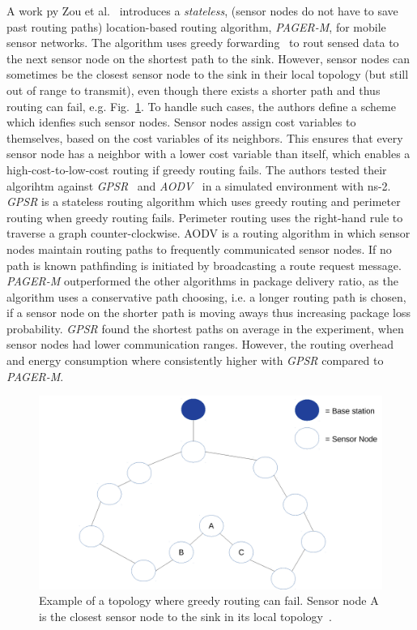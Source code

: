 A work py Zou et al.~\cite{zou2004pager} introduces a \textit{stateless},
(sensor nodes do not have to save past routing paths) location-based routing
algorithm, \textit{PAGER-M}, for mobile sensor networks. The algorithm uses
greedy forwarding~\cite{stojmenovic2001loop} to rout sensed data to the next
sensor node on the shortest path to the sink. However, sensor nodes can
sometimes be the closest sensor node to the sink in their local topology (but
still out of range to transmit), even though there exists a shorter path and
thus routing can fail, e.g. Fig.~\ref{fig:shadow nodes}. To handle such cases,
the authors define a scheme which idenfies such sensor nodes. Sensor nodes assign cost
variables to themselves, based on the cost variables of its neighbors. This
ensures that every sensor node has a neighbor with a lower cost variable than
itself, which enables a high-cost-to-low-cost routing if greedy routing fails.
The authors tested their algorihtm against \textit{GPSR}~\cite{karp2000gpsr}
and \textit{AODV}~\cite{perkins2003ad} in a simulated environment with ns-2.
\textit{GPSR} is a stateless routing algorithm which uses greedy routing and
perimeter routing when greedy routing fails. Perimeter routing uses the
right-hand rule to traverse a graph counter-clockwise. AODV is a routing
algorithm in which sensor nodes maintain routing paths to frequently
communicated sensor nodes. If no path is known pathfinding is initiated by
broadcasting a route request message. \textit{PAGER-M} outperformed the other
algorithms in package delivery ratio, as the algorithm uses a conservative path
choosing, i.e. a longer routing path is chosen, if a sensor node on the shorter
path is moving aways thus increasing package loss probability. \textit{GPSR}
found the shortest paths on average in the experiment, when sensor nodes had
lower communication ranges. However, the routing overhead and energy
consumption where consistently higher with \textit{GPSR} compared to
\textit{PAGER-M}.

\begin{figure}[h]
\includegraphics[width=\linewidth]{images/pager-shadow-nodes.pdf}
\caption{Example of a topology where greedy routing can fail. Sensor node A is
the closest sensor node to the sink in its local topology~\cite{zou2004pager}.}
\label{fig:shadow nodes}
\centering
\end{figure}

